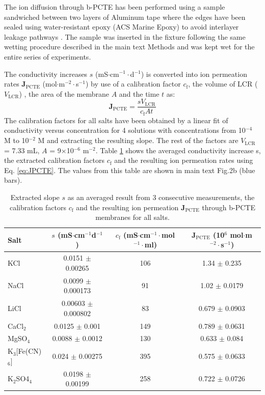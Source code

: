 \documentclass[manuscript=suppinfo,email=true, hyperref=true, keywords=false]{achemso}
\newcommand{\Fig}{Fig.}
\begin{document}
The ion diffusion through b-PCTE has been performed using a sample
sandwiched between two layers of Aluminum tape where the edges have
been sealed using water-resistant epoxy (ACS Marine Epoxy) to avoid
interlayer leakage pathways \cite{Choi_2018}.  The sample was inserted in
the fixture following the same wetting procedure described in the main
text Methods and was kept wet for the entire series of experiments.

The conductivity increases $s$ (mS$\cdot$cm$^{-1}\cdot$d$^{-1}$) is
converted into ion permeation rates $\boldsymbol{J}_{\mathrm{PCTE}}$
(mol$\cdot$m$^{-2}\cdot$s$^{-1}$) by use of a calibration factor
$c_{\mathrm{f}}$, the volume of LCR ($V_{\mathrm{LCR}}$) , the area of
the membrane $A$ and the time $t$ as:
\begin{equation}
  \label{eq:JPCTE}
  \boldsymbol{J}_{\mathrm{PCTE}} = \frac{s V_{\mathrm{LCR}}}{c_{\mathrm{f}} A t}
\end{equation}
The calibration factors for all salts have been obtained by a linear
fit of conductivity versus concentration for 4 solutions with
concentrations from 10$^{-4}$ M to 10$^{-2}$ M and extracting the
resulting slope. The rest of the factors are $V_{\mathrm{LCR}}$ = 7.33
mL, $A$ = 9$\times$10$^{-6}$ m$^{-2}$. Table \ref{tab:exp-2} shows the
averaged conductivity increase s, the extracted calibration factors
$c_{\mathrm{f}}$ and the resulting ion permeation rates using
Eq. \ref{eq:JPCTE}. The values from this table are shown in main text \Fig 2b
(blue bars).
\begin{table}[htbp]
  \centering
  \begin{tabular}{lccc}
    \hline
    Salt & $s$ (mS$\cdot$cm$^{-1}$d$^{-1}$) & $c_{\mathrm{f}}$ (mS$\cdot$cm$^{-1}\cdot$mol$^{-1}\cdot$ml) &
                                                                                                            $\boldsymbol{J}_{\mathrm{PCTE}}$ (10$^{6}$ mol$\cdot$m$^{-2}\cdot$s$^{-1}$)\\
    \hline
    KCl & 0.0151 $\pm$ 0.00265  & 106   & 1.34 $\pm$ 0.235\\
    NaCl        & 0.0099 $\pm$ 0.000173 & 91    & 1.02 $\pm$ 0.0179\\
    LiCl        & 0.00603 $\pm$ 0.000802        & 83    & 0.679 $\pm$ 0.0903\\
    CaCl$_{2}$  & 0.0125 $\pm$ 0.001    & 149   & 0.789 $\pm$ 0.0631\\
    MgSO$_{4}$  & 0.0088 $\pm$ 0.0012   & 130   & 0.633 $\pm$ 0.084\\
    K$_{3}$[Fe(CN)$_{6}]$ & 0.024 $\pm$ 0.00275   & 395   & 0.575 $\pm$ 0.0633\\
    K$_{2}$SO4$_{4}$    & 0.0198 $\pm$ 0.00199  & 258   & 0.722 $\pm$ 0.0726\\
    \hline
  \end{tabular}
  \caption{Extracted slope $s$ as an averaged result from 3 consecutive
    measurements, the calibration factors $c_{\mathrm{f}}$ and the resulting ion
    permeation $\boldsymbol{J}_{\mathrm{PCTE}}$ through b-PCTE membranes for all salts.}
  \label{tab:exp-2}
\end{table}
\end{document}
